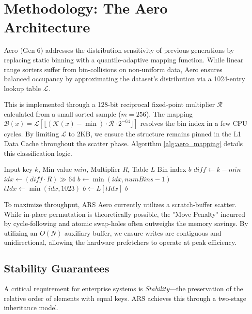 \section{Methodology: The Aero Architecture}
Aero (Gen 6) addresses the distribution sensitivity of previous generations by replacing static binning with a quantile-adaptive mapping function. While linear range sorters suffer from bin-collisions on non-uniform data, Aero ensures balanced occupancy by approximating the dataset's distribution via a 1024-entry lookup table $\mathcal{L}$.

This is implemented through a 128-bit reciprocal fixed-point multiplier $\mathcal{R}$ calculated from a small sorted sample ($m=256$). The mapping $\mathcal{B}(x) = \mathcal{L} [ \lfloor (\mathcal{K}(x) - \min) \cdot \mathcal{R} \cdot 2^{-64} \rfloor ]$ resolves the bin index in a few CPU cycles. By limiting $\mathcal{L}$ to 2KB, we ensure the structure remains pinned in the L1 Data Cache throughout the scatter phase. Algorithm \ref{alg:aero_mapping} details this classification logic.

\begin{algorithm}
\caption{Aero Division-Free Quantile Mapping}
\label{alg:aero_mapping}
\begin{algorithmic}[1]
\REQUIRE Input key $k$, Min value $min$, Multiplier $R$, Table $L$
\ENSURE Bin index $b$
\STATE $diff \leftarrow k - min$
\STATE $idx \leftarrow (diff \cdot R) \gg 64$ 
    \STATE $b \leftarrow \min(idx, numBins - 1)$
\ELSE
    \STATE $tIdx \leftarrow \min(idx, 1023)$
    \STATE $b \leftarrow L[tIdx]$ 
\ENDIF
\RETURN $b$
\end{algorithmic}
\end{algorithm}

To maximize throughput, ARS Aero currently utilizes a scratch-buffer scatter. While in-place permutation is theoretically possible, the "Move Penalty" incurred by cycle-following and atomic swap-holes often outweighs the memory savings. By utilizing an $O(N)$ auxiliary buffer, we ensure writes are contiguous and unidirectional, allowing the hardware prefetchers to operate at peak efficiency.

\subsection{Stability Guarantees}
A critical requirement for enterprise systems is \textit{Stability}—the preservation of the relative order of elements with equal keys. ARS achieves this through a two-stage inheritance model.

